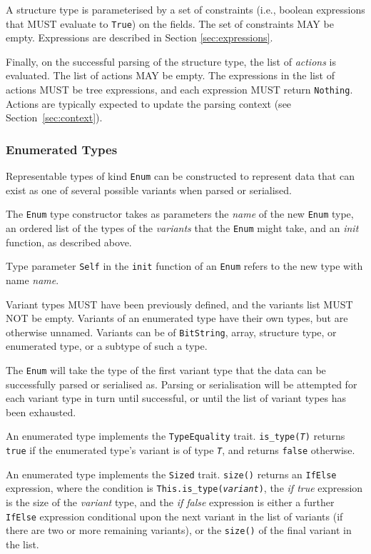 \documentclass[10pt,twocolumn,a4paper]{article}
\newcommand{\code}[1]{\texttt{#1}}
\begin{document}
A structure type is parameterised by a set of constraints (i.e., boolean
expressions that MUST evaluate to \code{True}) on the
fields. The set of constraints MAY be empty. Expressions are described in
Section \ref{sec:expressions}.

Finally, on the successful parsing of the structure type, the list of \emph{actions} is
evaluated. The list of actions MAY be empty.  The expressions in the list of actions MUST
be tree expressions, and each expression MUST return \code{Nothing}. Actions are typically
expected to update the parsing context (see Section~\ref{sec:context}).

\subsubsection{Enumerated Types}
\label{sec:enum-type}

Representable types of kind \code{Enum} can be constructed to represent
data that can exist as one of several possible variants when parsed or
serialised.

The \code{Enum} type constructor takes as parameters the \emph{name} of the
new \code{Enum} type, an ordered list of the types of the \emph{variants} that
the \code{Enum} might take, and an \emph{init} function, as described above.

Type parameter \code{Self} in the \code{init} function of an \code{Enum} refers
to the new type with name \emph{name}.

Variant types MUST have been
previously defined, and the variants list MUST NOT be empty. Variants of
an enumerated type have their own types, but are otherwise unnamed.
Variants can be of \code{BitString}, array, structure type, or enumerated type, or
a subtype of such a type.

The \code{Enum} will take the type of the first variant type that the data can be
successfully parsed or serialised as. Parsing or serialisation will be attempted for each
variant type in turn until successful, or until the list of variant types has been
exhausted.

An enumerated type implements the \code{TypeEquality} trait.
\code{is\_type(\emph{T})} returns \code{true} if the enumerated type's variant
is of type \code{\emph{T}}, and returns \code{false} otherwise.

An enumerated type implements the \code{Sized} trait.  \code{size()}
returns an \code{IfElse} expression, where the condition is
\code{This.is\_type(\emph{variant})}, the \emph{if true} expression is
the size of the \emph{variant} type, and the \emph{if false} expression is
either a further \code{IfElse} expression conditional upon the next variant in
the list of variants (if there are two or more remaining variants), or the
\code{size()} of the final variant in the list.
\end{document}
